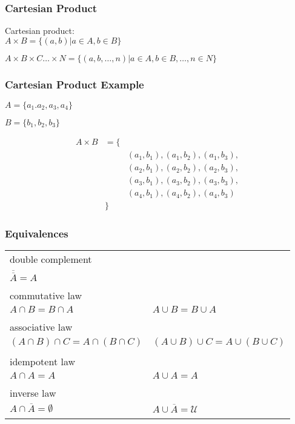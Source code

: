 \documentclass[dvipsnames]{beamer}
\begin{document}
\begin{frame}
  \frametitle{Cartesian Product}

  \begin{definition}
    \alert{Cartesian product}:\\
      $A \times B = \{ (a,b) | a \in A, b \in B \}$

      \medskip
      $A \times B \times C \dots \times N =
        \{ (a,b,\dots,n) | a \in A, b \in B, \dots, n \in N \}$
  \end{definition}
\end{frame}

\begin{frame}
  \frametitle{Cartesian Product Example}

  \begin{example}
    $A = \{a_1.a_2,a_3,a_4\}$

    $B = \{b_1,b_2,b_3\}$

    \medskip
    \begin{eqnarray*}
      A \times B & = \{ & \\
                 &      & (a_1,b_1),(a_1,b_2),(a_1,b_3),\\
                 &      & (a_2,b_1),(a_2,b_2),(a_2,b_3),\\
                 &      & (a_3,b_1),(a_3,b_2),(a_3,b_3),\\
                 &      & (a_4,b_1),(a_4,b_2),(a_4,b_3)\\
                 &  \}  &
    \end{eqnarray*}
  \end{example}
\end{frame}

\begin{frame}
  \frametitle{Equivalences}

  \begin{tabular}{ll}
    \alert{double complement} &\\
      $\overline{\overline{A}} = A$\\\\
    \pause
    \alert{commutative law} &\\
      $A \cap B = B \cap A$ &
      $A \cup B = B \cup A$\\\\
    \pause
    \alert{associative law} &\\
      $(A \cap B) \cap C = A \cap (B \cap C)$ &
      $(A \cup B) \cup C = A \cup (B \cup C)$\\\\
    \pause
    \alert{idempotent law} &\\
      $A \cap A = A$ &
      $A \cup A = A$\\\\
    \pause
    \alert{inverse law} &\\
      $A \cap \overline{A} = \emptyset$ &
      $A \cup \overline{A} = \mathcal{U}$\\\\
  \end{tabular}
\end{frame}
\end{document}
